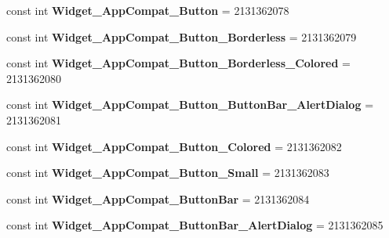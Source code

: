 \begin{DoxyCompactItemize}
const int {\bfseries Widget\+\_\+\+App\+Compat\+\_\+\+Button} = 2131362078
\item 
\mbox{\label{class_sample_app_1_1_droid_1_1_resource_1_1_style_aad5209ecf944aae56b13a4a43369fe10}} 
const int {\bfseries Widget\+\_\+\+App\+Compat\+\_\+\+Button\+\_\+\+Borderless} = 2131362079
\item 
\mbox{\label{class_sample_app_1_1_droid_1_1_resource_1_1_style_a6ba77fea4e7b6c8ba45a74ed4c349db6}} 
const int {\bfseries Widget\+\_\+\+App\+Compat\+\_\+\+Button\+\_\+\+Borderless\+\_\+\+Colored} = 2131362080
\item 
\mbox{\label{class_sample_app_1_1_droid_1_1_resource_1_1_style_a6162d78f220fc75ebc5537114f6eae70}} 
const int {\bfseries Widget\+\_\+\+App\+Compat\+\_\+\+Button\+\_\+\+Button\+Bar\+\_\+\+Alert\+Dialog} = 2131362081
\item 
\mbox{\label{class_sample_app_1_1_droid_1_1_resource_1_1_style_a42b186b799c23ad8ac9b002eb0d7a04a}} 
const int {\bfseries Widget\+\_\+\+App\+Compat\+\_\+\+Button\+\_\+\+Colored} = 2131362082
\item 
\mbox{\label{class_sample_app_1_1_droid_1_1_resource_1_1_style_a2942750767e73b7160fedbb40ca9e079}} 
const int {\bfseries Widget\+\_\+\+App\+Compat\+\_\+\+Button\+\_\+\+Small} = 2131362083
\item 
\mbox{\label{class_sample_app_1_1_droid_1_1_resource_1_1_style_adb6aa83f208f8fe3ac2a35e6ca2e652f}} 
const int {\bfseries Widget\+\_\+\+App\+Compat\+\_\+\+Button\+Bar} = 2131362084
\item 
\mbox{\label{class_sample_app_1_1_droid_1_1_resource_1_1_style_a0e914b12159b0b622852265bb6203bb4}} 
const int {\bfseries Widget\+\_\+\+App\+Compat\+\_\+\+Button\+Bar\+\_\+\+Alert\+Dialog} = 2131362085
\item 
\mbox{\label{class_sample_app_1_1_droid_1_1_resource_1_1_style_a49af62a0f6aad6bf068d5e7a805a3ef3}} 

\end{DoxyCompactItemize}
